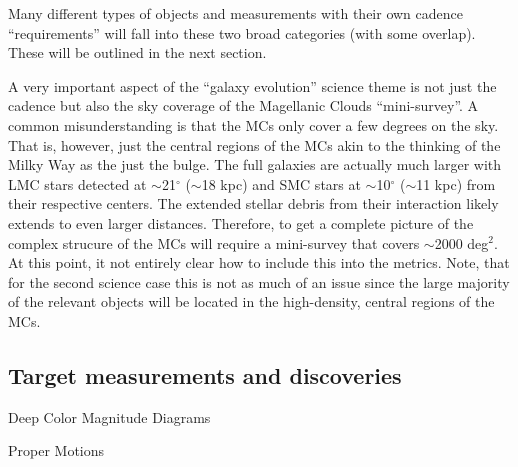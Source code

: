 Many different types of objects and measurements with their own cadence ``requirements'' will fall into
these two broad categories (with some overlap).  These will be outlined in the next section.

A very important aspect of the ``galaxy evolution'' science theme is not just the cadence but also the
sky coverage of the Magellanic Clouds ``mini-survey''.  A common misunderstanding is that the MCs only
cover a few degrees on the sky.  That is, however, just the central regions of the MCs akin to the thinking
of the Milky Way as the just the bulge.  The full galaxies are actually much larger with LMC stars
detected at $\sim$21$^{\circ}$ ($\sim$18 kpc) and SMC stars at $\sim$10$^{\circ}$ ($\sim$11 kpc) from their
respective centers.  The extended stellar debris from their interaction likely extends to even larger
distances.  Therefore, to get a complete picture of the complex strucure of the MCs will require a
mini-survey that covers $\sim$2000 deg$^2$.  At this point, it not entirely clear how to include this
into the metrics.  Note, that for the second science case this is not as much of an issue since the large
majority of the relevant objects will be located in the high-density, central regions of the MCs.



\subsection{Target measurements and discoveries}
\label{sec:keyword:targets}

%


\item Deep Color Magnitude Diagrams


\item Proper Motions

